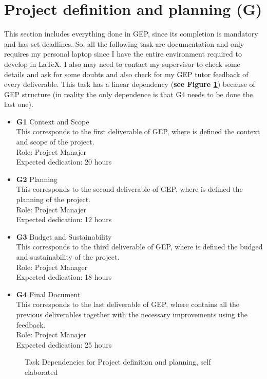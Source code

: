 \section{Project definition and planning \textbf{(G)} }
This section includes everything done in GEP, since its completion is mandatory and has set deadlines.
So, all the following task are documentation and only requires my personal laptop since I have the entire environment required to develop in \LaTeX.
I also may need to contact my supervisor to check some details and ask for some doubts and also check for my GEP tutor feedback of every deliverable.
This task has a linear dependency (\textbf{see Figure \ref{G_dependences}}) because of GEP structure (in reality the only dependence is that G4 needs to be done the last one).
\begin{itemize}
    \item \textbf{G1} Context and Scope \\
        This corresponds to the first deliverable of GEP, where is defined the context and scope of the project. \\
        Role: Project Manajer \\
        Expected dedication: 20 hours
    \item \textbf{G2} Planning \\
        This corresponds to the second deliverable of GEP, where is defined the planning of the project. \\
        Role: Project Manajer \\
        Expected dedication: 12 hours
    \item \textbf{G3} Budget and Sustainability \\
        This corresponds to the third deliverable of GEP, where is defined the budged and sustainability of the project. \\
        Role: Project Manager \\
        Expected dedication: 18 hours 
    \item \textbf{G4} Final Document \\
        This corresponds to the last deliverable of GEP, where contains all the previous deliverables together with the necessary improvements using the feedback. \\
        Role: Project Manajer \\
        Expected dedication: 25 hours
\end{itemize}
\begin{figure}[h]
    \centering
    \caption{Task Dependencies for Project definition and planning, self elaborated}
    \label{G_dependences}
\end{figure}

